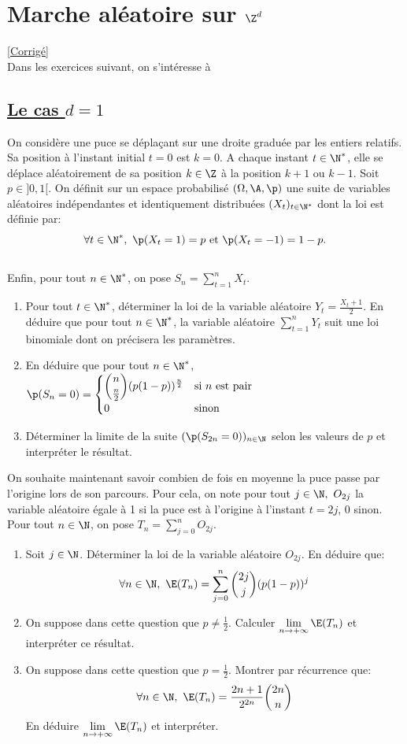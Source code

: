 \documentclass[8pt]{book}
\begin{document}
\section{Marche aléatoire sur $\Z^d$ }
\label{Marche aléatoire sur Z^d}
\textcolor{blue}{\hyperref[Marche aléatoire sur Z^d corrigé]{[Corrigé]}}\\
Dans les exercices suivant, on s'intéresse à

\subsection{\underline{Le cas $d=1$} }
On considère une puce se déplaçant sur une droite graduée par les entiers relatifs. Sa position à l'instant initial $t=0$ est $k=0$. A chaque instant $t\in\N^*$, elle se déplace aléatoirement de sa position $k\in\Z$ à la position $k+1$ ou $k-1$.
Soit $p\in]0,1[$. On définit sur un espace probabilisé $(\Omega,\A,\p)$ une suite de variables aléatoires indépendantes et identiquement distribuées $(X_t)_{t\in\N^*}$ dont la loi est définie par: $$\forall t\in\N^*,\ \p(X_t=1)=p \ \text{et } \p(X_t=-1)=1-p.$$
\\ Enfin, pour tout $n\in\N^*$, on pose $S_n=\displaystyle\sum\limits_{t=1}^nX_t$.
\begin{enumerate}
	\item Pour tout $t\in\N^*$, déterminer la loi de la variable aléatoire $Y_t=\displaystyle\frac{X_t+1}{2}$. En déduire que pour tout $n\in\N^*$, la variable aléatoire $\displaystyle\sum\limits_{t=1}^nY_t$ suit une loi binomiale dont on précisera les paramètres.
	\item En déduire que pour tout $n\in\N^*$, $\p(S_n=0)=\begin{cases} \displaystyle\binom{n}{\frac{n}{2}}(p(1-p))^{\frac{n}{2}} &\mbox{si }n\mbox{ est pair}\\
		0 & \mbox{sinon}
	\end{cases}$ 
	\item Déterminer la limite de la suite $(\p(S_{2n}=0))_{n\in \N}$ selon les valeurs de $p$ et interpréter le résultat.
\end{enumerate}
On souhaite maintenant savoir combien de fois en moyenne la puce passe par l'origine lors de son parcours. Pour cela, on note pour tout $j\in\N, \ O_{2j}$ la variable aléatoire égale à 1 si la puce est à l'origine à l'instant $t=2j$, 0 sinon. Pour tout $n\in\N$, on pose $T_n=\displaystyle\sum\limits_ {j=0}^nO_{2j}$.
\begin{enumerate}[resume]
	\item Soit $j\in\N$. Déterminer la loi de la variable aléatoire $O_{2j}$. En déduire que: $$\forall n\in \N,\ \E(T_n)=\displaystyle\sum\limits_{j=0}^n \binom{2j}{j}(p(1-p))^j$$
	\item On suppose dans cette question que $p\ne\displaystyle\frac{1}{2}$. Calculer $\lim\limits_{n\to+\infty}\E(T_n)$ et interpréter ce résultat.
	\item On suppose dans cette question que $p=\displaystyle\frac{1}{2}$. Montrer par récurrence que: $$\forall n\in\N,\ \E(T_n)=\displaystyle\frac{2n+1}{2^{2n}}\binom{2n}{n}$$
	En déduire $\lim\limits_{n\to+\infty}\E(T_n)$ et interpréter.
\end{enumerate}
\end{document}
